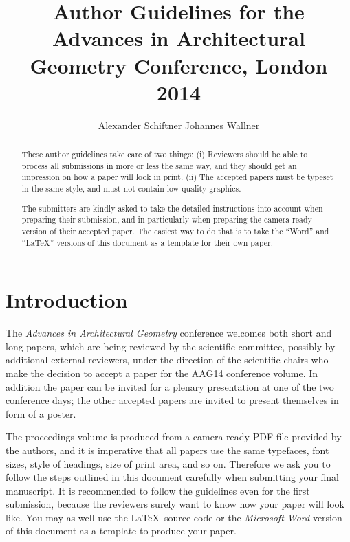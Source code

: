 \documentclass[twoside]{article}
\begin{document}
\title{Author Guidelines for the Advances in Architectural
	Geometry Conference, London 2014}

\author{Alexander Schiftner 
	Johannes Wallner }

\maketitle

\def\shortauthor{A. Schiftner and J.\ Wallner}  %
\def\shorttitle{Author Guidelines for AAG}   %


\begin{abstract} These author guidelines take care of two things: (i) 
Reviewers should be able to process all submissions in more or less the 
same way, and they should get an impression on how a paper will look in 
print. (ii) The accepted papers must be typeset in the same style, and 
must not contain low quality graphics. 

The submitters are kindly asked to 
take the detailed instructions into account when preparing their 
submission, and in particularly when preparing the camera-ready version of 
their accepted paper. The easiest way to do that is to take the ``Word'' 
and ``\LaTeX'' versions of this document as a template for their own paper. 
\end{abstract}

\section{Introduction}

The {\em Advances in Architectural Geometry} conference welcomes both 
short and long papers, which are being reviewed by the scientific 
committee, possibly by additional external reviewers, under the direction 
of the scientific chairs who make the decision to accept a paper for the 
AAG14 conference volume. In addition the paper can be invited for a 
plenary presentation at one of the two conference days; the other accepted 
papers are invited to present themselves in form of a poster.

The proceedings volume is produced from a camera-ready PDF file provided 
by the authors, and it is imperative that all papers use the same 
typefaces, font sizes, style of headings, size of print area, and so on. 
Therefore we ask you to follow the steps outlined in this document 
carefully when submitting your final manuscript. It is recommended to 
follow the guidelines even for the first submission, because the reviewers 
surely want to know how your paper will look like. You may as well use the 
\LaTeX\ source code or the {\em Microsoft Word} version of this document 
as a template to produce your paper.
\end{document}
